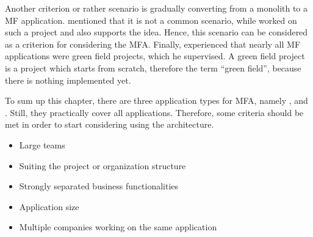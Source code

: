 Another criterion or rather scenario is gradually converting from a monolith to a \ac{MF} application.
\textciteSteyer{} mentioned that it is not a common scenario, while \textciteJovanovic{} worked on such a project and \textcite{Jackson.2019} also supports the idea.
Hence, this scenario can be considered as a criterion for considering the \ac{MFA}.
Finally, \citeauthorSteyer{} experienced that nearly all \ac{MF} applications were green field projects, which he supervised.
A green field project is a project which starts from scratch, therefore the term \enquote{green field}, because there is nothing implemented yet.

To sum up this chapter, there are three application types for \ac{MFA}, namely \textit{}, \textit{} and \textit{}.
Still, they practically cover all applications.
Therefore, some criteria should be met in order to start considering using the architecture.

\begin{itemize}
    \item Large teams
    \item Suiting the project or organization structure
    \item Strongly separated business functionalities
    \item Application size
    \item Multiple companies working on the same application
\end{itemize}
